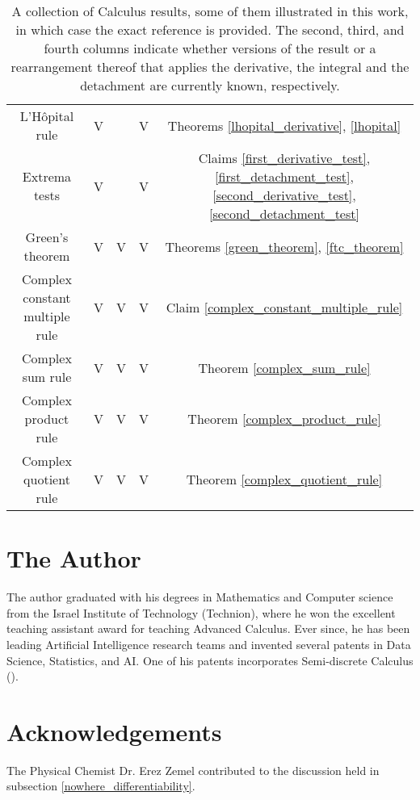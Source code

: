 \documentclass[11pt]{book}
\begin{document}
\begin{table}[h!]
\begin{tabular}{ccccc}
        L'Hôpital rule & \color[HTML]{FFA006} V & & \color[HTML]{0039BD} V & Theorems \ref{lhopital_derivative}, \ref{lhopital} \\
        Extrema tests & \color[HTML]{FFA006} V & & \color[HTML]{0039BD} V & Claims \ref{first_derivative_test}, \ref{first_detachment_test}, \ref{second_derivative_test}, \ref{second_detachment_test} \\
        Green's theorem & \color[HTML]{FFA006} V & \color[HTML]{7800cf} V & \color[HTML]{0039BD} V & Theorems \ref{green_theorem}, \ref{ftc_theorem} \\
        Complex constant multiple rule & \color[HTML]{FFA006} V & \color[HTML]{7800cf} V & \color[HTML]{0039BD} V & Claim \ref{complex_constant_multiple_rule} \\
        Complex sum rule & \color[HTML]{FFA006} V & \color[HTML]{7800cf} V & \color[HTML]{0039BD} V & Theorem \ref{complex_sum_rule} \\
        Complex product rule & \color[HTML]{FFA006} V & \color[HTML]{7800cf} V & \color[HTML]{0039BD} V & Theorem \ref{complex_product_rule} \\
        Complex quotient rule & \color[HTML]{FFA006} V & \color[HTML]{7800cf} V & \color[HTML]{0039BD} V & Theorem \ref{complex_quotient_rule} \\
        \bottomrule
        \end{tabular}
\color{black}
\caption{A collection of Calculus results, some of them illustrated in this work, in which case the exact reference is provided. The second, third, and fourth columns indicate whether versions of the result or a rearrangement thereof that applies the derivative, the integral and the detachment are currently known, respectively.}
\label{results_table}
\end{table}

\section{The Author}
The author graduated with his degrees in Mathematics and Computer science from the Israel Institute of Technology (Technion), where he won the excellent teaching assistant award for teaching Advanced Calculus. Ever since, he has been leading Artificial Intelligence research teams and invented several patents in Data Science, Statistics, and AI. One of his patents incorporates Semi-discrete Calculus (\cite{shacharpatent}).


\section{Acknowledgements}
The Physical Chemist Dr. Erez Zemel contributed to the discussion held in subsection \ref{nowhere_differentiability}.
\end{document}
